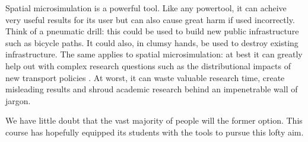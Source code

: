\documentclass[a4paper, 11pt, twoside]{article}
\begin{document}
Spatial microsimulation is a powerful tool.
Like any powertool, it can acheive very useful results for its user
but can also cause great harm if used incorrectly. 
Think of a pneumatic drill: this could be used to build new
public infrastructure such as bicycle paths. It could also,
in clumsy hands, be used to destroy existing infrastructure.
The same applies to spatial microsimulation:
at best it can greatly help out with complex research questions such
as the distributional impacts of new transport policies \citep{Lovelace2014-jtg}.
At worst, it can waste valuable research time, create misleading results
and shroud academic research behind an impenetrable wall of jargon.

We have little doubt that the vast majority of
people will the former option. This course has hopefully
equipped its students with
the tools to pursue this lofty aim.
\end{document}
